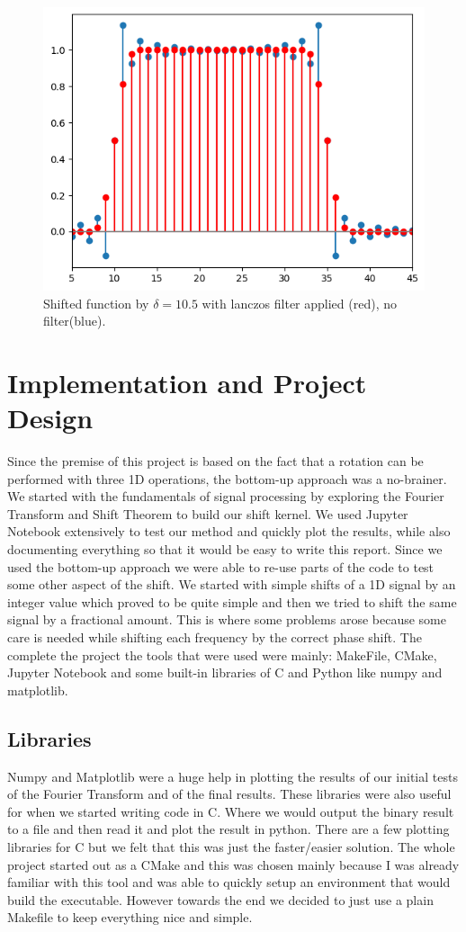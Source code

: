 \documentclass[]{usiinfbachelorproject}
\begin{document}
	\begin{figure}[h]
		\centering
		\includegraphics[width=0.5\columnwidth]{images/box_shifted_lanczos_delta10_1_n50.png}
		\caption{Shifted function by $\delta=10.5$ with lanczos filter applied (red), no filter(blue).}
	\end{figure}
	
	\fi
	
	\newpage
	
	\section{Implementation and Project Design}
		Since the premise of this project is based on the fact that a rotation can be performed with three 1D operations, the bottom-up approach was a no-brainer. We started with the fundamentals of signal processing by exploring the Fourier Transform and Shift Theorem to build our shift kernel. We used Jupyter Notebook extensively to test our method and quickly plot the results, while also documenting everything so that it would be easy to write this report. Since we used the bottom-up approach we were able to re-use parts of the code to test some other aspect of the shift. We started with simple shifts of a 1D signal by an integer value which proved to be quite simple and then we tried to shift the same signal by a fractional amount. This is where some problems arose because some care is needed while shifting each frequency by the correct phase shift.
		The complete the project the tools that were used were mainly: MakeFile, CMake, Jupyter Notebook and some built-in libraries of C and Python like numpy and matplotlib.
		
	\subsection{Libraries}
		Numpy and Matplotlib were a huge help in plotting the results of our initial tests of the Fourier Transform and of the final results. These libraries were also useful for when we started writing code in C. Where we would output the binary result to a file and then read it and plot the result in python. There are a few plotting libraries for C but we felt that this was just the faster/easier solution.
		The whole project started out as a CMake and this was chosen mainly because I was already familiar with this tool and was able to quickly setup an environment that would build the executable. However towards the end we decided to just use a plain Makefile to keep everything nice and simple.
		
\end{document}
